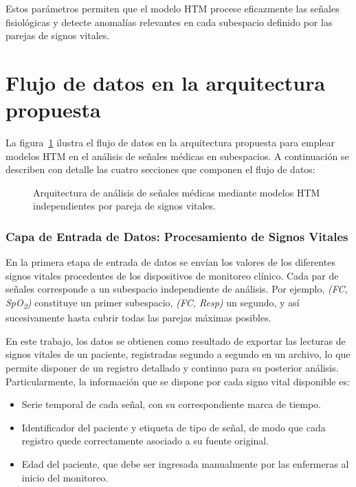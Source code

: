\medskip

Estos parámetros permiten que el modelo HTM procese eficazmente las señales fisiológicas y detecte anomalías relevantes en cada subespacio definido por las parejas de signos vitales.

\section{Flujo de datos en la arquitectura propuesta}

La figura~\ref{fig:arquitectura_subespacios} ilustra el flujo de datos en la arquitectura propuesta para emplear modelos HTM en el análisis de señales médicas en subespacios. A continuación se describen con detalle las cuatro secciones que componen el flujo de datos:

\begin{figure}[ht]
  \centering
  
  \captionsetup{justification=centering}
  \caption{Arquitectura de análisis de señales médicas mediante modelos HTM independientes por pareja de signos vitales.}
  \label{fig:arquitectura_subespacios}
\end{figure}

\subsubsection*{Capa de Entrada de Datos: Procesamiento de Signos Vitales}

En la primera etapa de entrada de datos se envían los valores de los diferentes signos vitales procedentes de los dispositivos de monitoreo clínico. Cada par de señales corresponde a un subespacio independiente de análisis. Por ejemplo, \emph{(FC, SpO\textsubscript{2})} constituye un primer subespacio, \emph{(FC, Resp)} un segundo, y así sucesivamente hasta cubrir todas las parejas máximas posibles.

En este trabajo, los datos se obtienen como resultado de exportar las lecturas de signos vitales de un paciente, registradas segundo a segundo en un archivo, lo que permite disponer de un registro detallado y continuo para su posterior análisis. Particularmente, la información que se dispone por cada signo vital disponible es:

\begin{itemize}
  \item Serie temporal de cada señal, con su correspondiente marca de tiempo.
  \item Identificador del paciente y etiqueta de tipo de señal, de modo que cada registro quede correctamente asociado a su fuente original.
  \item Edad del paciente, que debe ser ingresada manualmente por las enfermeras al inicio del monitoreo.
\end{itemize}

